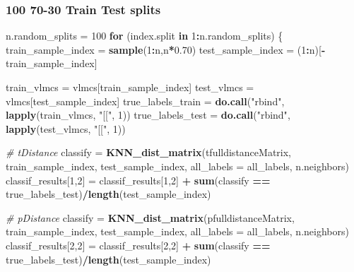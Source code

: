 \documentclass[
]{article}
\newenvironment{Shaded}{\begin{snugshade}}{\end{snugshade}}
\newcommand{\AttributeTok}[1]{\textcolor[rgb]{0.13,0.29,0.53}{#1}}
\newcommand{\CommentTok}[1]{\textcolor[rgb]{0.56,0.35,0.01}{\textit{#1}}}
\newcommand{\ControlFlowTok}[1]{\textcolor[rgb]{0.13,0.29,0.53}{\textbf{#1}}}
\newcommand{\DecValTok}[1]{\textcolor[rgb]{0.00,0.00,0.81}{#1}}
\newcommand{\FloatTok}[1]{\textcolor[rgb]{0.00,0.00,0.81}{#1}}
\newcommand{\FunctionTok}[1]{\textcolor[rgb]{0.13,0.29,0.53}{\textbf{#1}}}
\newcommand{\NormalTok}[1]{#1}
\newcommand{\OtherTok}[1]{\textcolor[rgb]{0.56,0.35,0.01}{#1}}
\newcommand{\SpecialCharTok}[1]{\textcolor[rgb]{0.81,0.36,0.00}{\textbf{#1}}}
\newcommand{\StringTok}[1]{\textcolor[rgb]{0.31,0.60,0.02}{#1}}
\begin{document}
\subsubsection{100 70-30 Train Test splits}\label{train-test-splits}

\begin{Shaded}
\begin{Highlighting}[]
\NormalTok{n.random\_splits }\OtherTok{=} \DecValTok{100}       
\ControlFlowTok{for}\NormalTok{ (index.split }\ControlFlowTok{in} \DecValTok{1}\SpecialCharTok{:}\NormalTok{n.random\_splits)}
\NormalTok{\{   }
\NormalTok{  train\_sample\_index }\OtherTok{=} \FunctionTok{sample}\NormalTok{(}\DecValTok{1}\SpecialCharTok{:}\NormalTok{n,n}\SpecialCharTok{*}\FloatTok{0.70}\NormalTok{)}
\NormalTok{  test\_sample\_index }\OtherTok{=}\NormalTok{ (}\DecValTok{1}\SpecialCharTok{:}\NormalTok{n)[}\SpecialCharTok{{-}}\NormalTok{train\_sample\_index]}
  
\NormalTok{  train\_vlmcs }\OtherTok{=}\NormalTok{ vlmcs[train\_sample\_index]}
\NormalTok{  test\_vlmcs }\OtherTok{=}\NormalTok{ vlmcs[test\_sample\_index]}
\NormalTok{  true\_labels\_train }\OtherTok{=} \FunctionTok{do.call}\NormalTok{(}\StringTok{"rbind"}\NormalTok{, }\FunctionTok{lapply}\NormalTok{(train\_vlmcs, }\StringTok{"[["}\NormalTok{, }\DecValTok{1}\NormalTok{))}
\NormalTok{  true\_labels\_test }\OtherTok{=} \FunctionTok{do.call}\NormalTok{(}\StringTok{"rbind"}\NormalTok{, }\FunctionTok{lapply}\NormalTok{(test\_vlmcs, }\StringTok{"[["}\NormalTok{, }\DecValTok{1}\NormalTok{))}
  
  \CommentTok{\# tDistance }
\NormalTok{  classify }\OtherTok{=} \FunctionTok{KNN\_dist\_matrix}\NormalTok{(tfulldistanceMatrix, train\_sample\_index, test\_sample\_index, }\AttributeTok{all\_labels =}\NormalTok{ all\_labels, n.neighbors)}
\NormalTok{  classif\_results[}\DecValTok{1}\NormalTok{,}\DecValTok{2}\NormalTok{] }\OtherTok{=}\NormalTok{ classif\_results[}\DecValTok{1}\NormalTok{,}\DecValTok{2}\NormalTok{] }\SpecialCharTok{+} \FunctionTok{sum}\NormalTok{(classify }\SpecialCharTok{==}\NormalTok{ true\_labels\_test)}\SpecialCharTok{/}\FunctionTok{length}\NormalTok{(test\_sample\_index)}
  
  \CommentTok{\# pDistance}
\NormalTok{  classify }\OtherTok{=} \FunctionTok{KNN\_dist\_matrix}\NormalTok{(pfulldistanceMatrix, train\_sample\_index, test\_sample\_index, }\AttributeTok{all\_labels =}\NormalTok{ all\_labels, n.neighbors)}
\NormalTok{  classif\_results[}\DecValTok{2}\NormalTok{,}\DecValTok{2}\NormalTok{] }\OtherTok{=}\NormalTok{ classif\_results[}\DecValTok{2}\NormalTok{,}\DecValTok{2}\NormalTok{] }\SpecialCharTok{+} \FunctionTok{sum}\NormalTok{(classify }\SpecialCharTok{==}\NormalTok{ true\_labels\_test)}\SpecialCharTok{/}\FunctionTok{length}\NormalTok{(test\_sample\_index)}
  

\end{Highlighting}
\end{Shaded}
\end{document}
